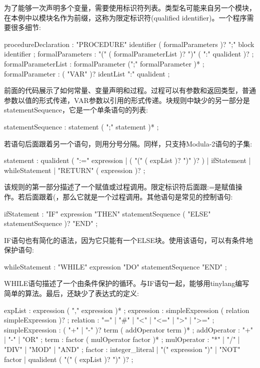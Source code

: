 为了能够一次声明多个变量，需要使用标识符列表。类型名可能来自另一个模块，在本例中以模块名作为前缀，这称为限定标识符(qualified identifier)。一个程序需要很多细节:

\begin{shell}
procedureDeclaration
    : "PROCEDURE" identifier ( formalParameters )? ";"
        block identifier ;
formalParameters
    : "(" ( formalParameterList )? ")" ( ":" qualident )? ;
formalParameterList
    : formalParameter (";" formalParameter )* ;
formalParameter : ( "VAR" )? identList ":" qualident ;
\end{shell}

前面的代码展示了如何常量、变量声明和过程。过程可以有参数和返回类型，普通参数以值的形式传递，VAR参数以引用的形式传递。块规则中缺少的另一部分是statementSequence，它是一个单条语句的列表:

\begin{shell}
statementSequence
    : statement ( ";" statement )* ;
\end{shell}

若语句后面跟着另一个语句，则用分号分隔。同样，只支持Modula-2语句的子集:

\begin{shell}
statement
    : qualident ( ":=" expression | ( "(" ( expList )? ")" )? )
    | ifStatement | whileStatement | "RETURN" ( expression )? ;
\end{shell}

该规则的第一部分描述了一个赋值或过程调用。限定标识符后面跟:=是赋值操作。若后面跟着(，那么它就是一个过程调用。其他语句是常见的控制语句:

\begin{shell}
ifStatement
    : "IF" expression "THEN" statementSequence
        ( "ELSE" statementSequence )? "END" ;
\end{shell}

IF语句也有简化的语法，因为它只能有一个ELSE块。使用该语句，可以有条件地保护语句:

\begin{shell}
whileStatement
    : "WHILE" expression "DO" statementSequence "END" ;
\end{shell}

WHILE语句描述了一个由条件保护的循环。与IF语句一起，能够用tinylang编写简单的算法。最后，还缺少了表达式的定义:

\begin{shell}
expList
    : expression ( "," expression )* ;
expression
    : simpleExpression ( relation simpleExpression )? ;
relation
    : "=" | "#" | "<" | "<=" | ">" | ">=" ;
simpleExpression
    : ( "+" | "-" )? term ( addOperator term )* ;
addOperator
    : "+" | "-" | "OR" ;
term
    : factor ( mulOperator factor )* ;
mulOperator
    : "*" | "/" | "DIV" | "MOD" | "AND" ;
factor
    : integer_literal | "(" expression ")" | "NOT" factor
    | qualident ( "(" ( expList )? ")" )? ;
\end{shell}


